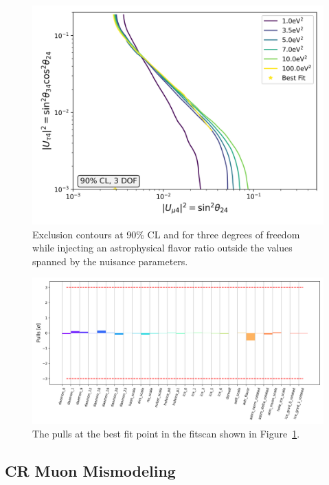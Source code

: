 \documentclass[main.tex]{subfiles}
\begin{document}
\begin{figure}
    \centering
    \includegraphics[width=0.7\linewidth]{figures/joint_astro_flavor_misfit_Realization_daemon_badflavor_Asimov_sterile_0_cl0.9_dof3.png}
    \caption{Exclusion contours at 90\% CL and for three degrees of freedom while injecting an astrophysical flavor ratio outside the values spanned by the nuisance parameters.}\label{fig:flavor_mismodel}
\end{figure}

\begin{figure}
    \centering
    \includegraphics[width=0.7\linewidth]{figures/pulls_Realization_daemon_badflavor_Asimov_sterile_0_joint_astro_flavor_misfit.png}
    \caption{The pulls at the best fit point in the fitscan shown in Figure~\ref{fig:flavor_mismodel}.}\label{fig:flavor_mismodel_pulls}
\end{figure}

\subsection{CR Muon Mismodeling}
\end{document}
